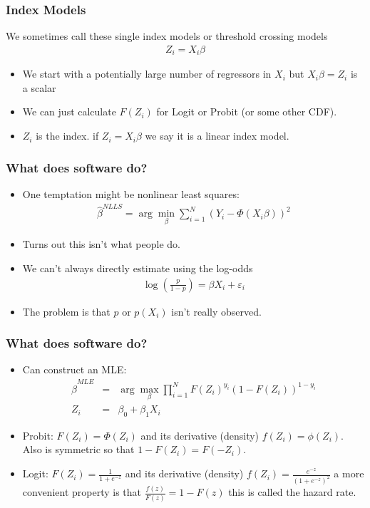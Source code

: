 \begin{frame}
\frametitle{Index Models}
We sometimes call these single index models or threshold crossing models
\begin{eqnarray*}
Z_i = X_i \beta
\end{eqnarray*}
\begin{itemize}
\item We start with a potentially large number of regressors in $X_i$ but $X_i \beta = Z_i$ is a \alert{scalar}
\item We can just calculate $F(Z_i)$ for Logit or Probit (or some other CDF).
\item $Z_i$ is the \alert{index}. if $Z_i = X_i \beta$ we say it is a \alert{linear index} model.
\end{itemize}
\end{frame}




\begin{frame}
\frametitle{What does software do?}
\begin{itemize}
\item One temptation might be \alert{nonlinear least squares}:
\begin{eqnarray*}
\hat{\beta}^{NLLS} = \arg \min_{\beta} \sum_{i=1}^N (Y_i - \Phi(X_i \beta))^2
\end{eqnarray*}
\item Turns out this isn't what people do.
\item We can't always directly estimate using the log-odds
\begin{eqnarray*}
\log\left(\frac{p}{1-p}\right)= \beta X_i + \varepsilon_i
\end{eqnarray*}
\item The problem is that $p$ or $p(X_i)$ isn't really observed.
\end{itemize}
\end{frame}

\begin{frame}
\frametitle{What does software do?}
\begin{itemize}
\item Can construct an MLE:
\begin{eqnarray*}
\hat{\beta}^{MLE} &=& \arg \max_{\beta} \prod_{i=1}^N F(Z_i)^{y_i} (1-F(Z_i))^{1-{y_i} }\\
Z_i &=& \beta_0 + \beta_1 X_i
\end{eqnarray*}
\item Probit: $F(Z_i) = \Phi(Z_i)$ and its derivative (density) $f(Z_i) = \phi(Z_i)$. \\
Also is \alert{symmetric} so that $1 - F(Z_i) = F(-Z_i)$.
\item Logit: $F(Z_i) = \frac{1}{1+e^{-z}}$ and its derivative (density) $f(Z_i) = \frac{e^{-z}}{(1+e^{-z})^2}$ a more convenient property is that $\frac{f(z)}{F(z)} = 1 - F(z)$ this is called the \alert{hazard rate}.
\end{itemize}
\end{frame}

